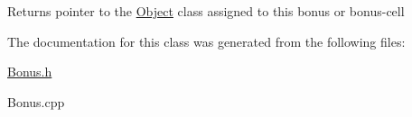 \begin{DoxyReturn}{Returns}
pointer to the \hyperlink{class_object}{Object} class assigned to this bonus or bonus-\/cell 
\end{DoxyReturn}


The documentation for this class was generated from the following files\+:\begin{DoxyCompactItemize}
\item 
\hyperlink{_bonus_8h}{Bonus.\+h}\item 
Bonus.\+cpp\end{DoxyCompactItemize}
